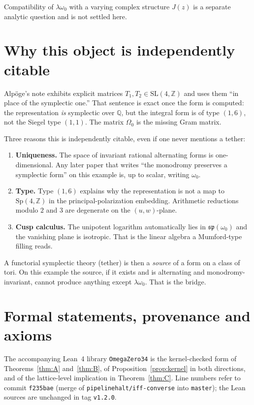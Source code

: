 \documentclass[11pt,a4paper]{article}
\theoremstyle{definition}
\theoremstyle{remark}
\newcommand{\Q}{\mathbb{Q}}
\newcommand{\Z}{\mathbb{Z}}
\newcommand{\spq}{\mathfrak{sp}}
\begin{document}
Compatibility of $\lambda\omega_0$ with a varying complex structure $J(z)$ is a separate analytic question and is not settled here.

\section{Why this object is independently citable}

Alp\"oge's note exhibits explicit matrices $T_1,T_2\in\mathrm{SL}(4,\Z)$ and uses them ``in place of the symplectic one.'' That sentence is exact once the form is computed: the representation \emph{is} symplectic over $\Q$, but the integral form is of type $(1,6)$, not the Siegel type $(1,1)$. The matrix $\Omega_0$ is the missing Gram matrix.

Three reasons this is independently citable, even if one never mentions a tether:

\begin{enumerate}
\item \textbf{Uniqueness.} The space of invariant rational alternating forms is one-dimensional. Any later paper that writes ``the monodromy preserves a symplectic form'' on this example is, up to scalar, writing $\omega_0$.
\item \textbf{Type.} Type $(1,6)$ explains why the representation is not a map to $\mathrm{Sp}(4,\Z)$ in the principal-polarization embedding. Arithmetic reductions modulo $2$ and $3$ are degenerate on the $(u,w)$-plane.
\item \textbf{Cusp calculus.} The unipotent logarithm automatically lies in $\spq(\omega_0)$ and the vanishing plane is isotropic. That is the linear algebra a Mumford-type filling reads.
\end{enumerate}

A functorial symplectic theory (tether) is then a \emph{source} of a form on a class of tori. On this example the source, if it exists and is alternating and monodromy-invariant, cannot produce anything except $\lambda\omega_0$. That is the bridge.

\section{Formal statements, provenance and axioms}\label{sec:formal}

The accompanying Lean~4 library \texttt{OmegaZero34} is the kernel-checked form of Theorems~\ref{thm:A} and~\ref{thm:B}, of Proposition~\ref{prop:kernel} in both directions, and of the lattice-level implication in Theorem~\ref{thm:C}. Line numbers refer to commit \texttt{f235bae} (merge of \texttt{pipelinehalt/iff-converse} into \texttt{master}); the Lean sources are unchanged in tag \texttt{v1.2.0}.
\end{document}
